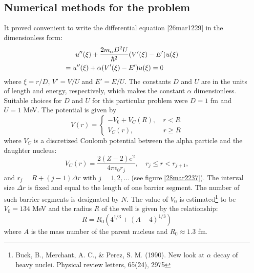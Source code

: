 \documentclass[twocolumn]{article}
\begin{document}
\begin{large}
\subsection*{Numerical methods for the problem}
It proved convenient to write the differential equation \eqref{26mar1229} in the dimensionless form: 
\begin{equation}
    \label{26mar1412}
    \begin{split}
        &u''(\xi) + \frac{2m_\alpha D^2U}{\hbar^2}(V'(\xi)-E')u(\xi) \\ 
        &\hspace{-0.6cm}=  u''(\xi) + \alpha(V'(\xi)-E')u(\xi) = 0 
    \end{split}
\end{equation}
where $\xi=r/D$, $V'=V/U$ and $E'=E/U$. The constants $D$ and $U$ are in the units of length and energy, respectively, which makes the constant $\alpha$ dimensionless. Suitable choices for $D$ and $U$ for this particular problem were $D=1$ fm and $U=1$ MeV. 
The potential is given by
\begin{equation}
    V(r) = 
    \begin{cases}
        -V_0 + V_C(R), \quad r < R \\
        V_C(r), \qquad\qquad\,\, r\geq R
    \end{cases}
\end{equation}
where $V_C$ is a discretized Coulomb potential between the alpha particle and the daughter nucleus: 
\begin{equation}
    V_C(r) = \frac{2(Z-2)e^2}{4\pi\epsilon_0r_j},\quad r_j\leq r < r_{j+1},
\end{equation}
and $r_j = R+(j-1)\Delta r$ with $j=1,2,\dots$ (see figure \ref{28mar2237}). The interval size $\Delta r$ is fixed and equal to the length of one barrier segment. The number of such barrier segments is designated by $N$. The value of $V_0$ is estimated\footnote{Buck, B., Merchant, A. C., \& Perez, S. M. (1990). New look at $\alpha$ decay of heavy nuclei. Physical review letters, 65(24), 2975} to be $V_0 = 134$ MeV and the radius $R$ of the well is given by the relationship:
\begin{equation}
    R = R_0\left(4^{1/3} + (A-4)^{1/3}\right)
\end{equation}
where $A$ is the mass number of the parent nucleus and $R_0 \approx 1.3$ fm. 


\end{large}
\end{document}
